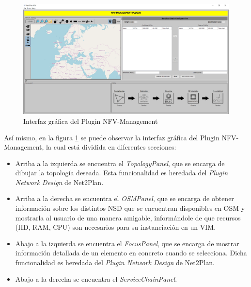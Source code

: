 \begin{figure}[!ht]
	\centering
	\includegraphics[width=0.8\linewidth]{imagenes/nfvplugin_dashboard}
	\caption{Interfaz gráfica del Plugin NFV-Management}
	\label{fig:nfvplugindash}
\end{figure}

Así mismo, en la figura \ref{fig:nfvplugindash} se puede observar la interfaz gráfica del Plugin NFV-Management, la cual está dividida en diferentes secciones:

\begin{itemize}
	\item Arriba a la izquierda se encuentra el \textit{TopologyPanel}, que se encarga de dibujar la topología deseada. Esta funcionalidad es heredada del \textit{Plugin Network Design} de Net2Plan.
	
	\item Arriba a la derecha se encuentra el \textit{OSMPanel}, que se encarga de obtener información sobre los distintos NSD que se encuentran disponibles en OSM y mostrarla al usuario de una manera amigable, informándole de que recursos (HD, RAM, CPU) son necesarios para su instanciación en un VIM.
	
	\item Abajo a la izquierda se encuentra el \textit{FocusPanel}, que se encarga de mostrar información detallada de un elemento en concreto cuando se selecciona. Dicha funcionalidad es heredada del \textit{Plugin Network Design} de Net2Plan.
	
	\item Abajo a la derecha se encuentra el \textit{ServiceChainPanel}.
\end{itemize}




\cleardoublepage